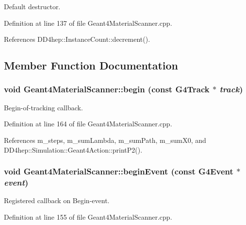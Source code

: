 Default destructor. 

Definition at line 137 of file Geant4MaterialScanner.cpp.

References DD4hep::InstanceCount::decrement().

\subsection{Member Function Documentation}
\hypertarget{class_d_d4hep_1_1_simulation_1_1_geant4_material_scanner_adb6b4a72be62b6b7c440db01d147d7e1}{
\subsubsection[{begin}]{\setlength{\rightskip}{0pt plus 5cm}void Geant4MaterialScanner::begin (const G4Track $\ast$ {\em track})}}
\label{class_d_d4hep_1_1_simulation_1_1_geant4_material_scanner_adb6b4a72be62b6b7c440db01d147d7e1}


Begin-\/of-\/tracking callback. 

Definition at line 164 of file Geant4MaterialScanner.cpp.

References m\_\-steps, m\_\-sumLambda, m\_\-sumPath, m\_\-sumX0, and DD4hep::Simulation::Geant4Action::printP2().\hypertarget{class_d_d4hep_1_1_simulation_1_1_geant4_material_scanner_af8c21aaac99b7f654c98f83a3382c9f4}{
\subsubsection[{beginEvent}]{\setlength{\rightskip}{0pt plus 5cm}void Geant4MaterialScanner::beginEvent (const G4Event $\ast$ {\em event})}}
\label{class_d_d4hep_1_1_simulation_1_1_geant4_material_scanner_af8c21aaac99b7f654c98f83a3382c9f4}


Registered callback on Begin-\/event. 

Definition at line 155 of file Geant4MaterialScanner.cpp.

